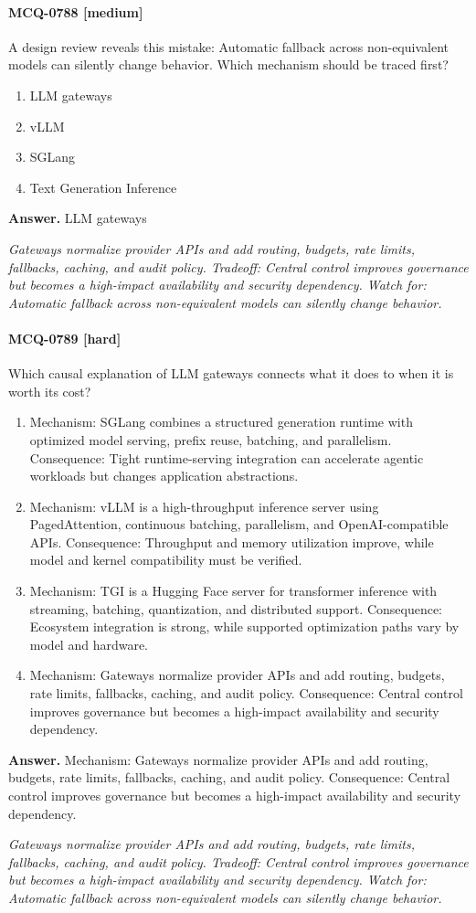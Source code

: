 \paragraph{MCQ-0788 [medium]} A design review reveals this mistake: Automatic fallback across non-equivalent models can silently change behavior. Which mechanism should be traced first?
\begin{enumerate}[label=\Alph*.]
\item LLM gateways
\item vLLM
\item SGLang
\item Text Generation Inference
\end{enumerate}
\noindent\textbf{Answer.} LLM gateways
\par\textit{Gateways normalize provider APIs and add routing, budgets, rate limits, fallbacks, caching, and audit policy. Tradeoff: Central control improves governance but becomes a high-impact availability and security dependency. Watch for: Automatic fallback across non-equivalent models can silently change behavior.}
\paragraph{MCQ-0789 [hard]} Which causal explanation of LLM gateways connects what it does to when it is worth its cost?
\begin{enumerate}[label=\Alph*.]
\item Mechanism: SGLang combines a structured generation runtime with optimized model serving, prefix reuse, batching, and parallelism. Consequence: Tight runtime-serving integration can accelerate agentic workloads but changes application abstractions.
\item Mechanism: vLLM is a high-throughput inference server using PagedAttention, continuous batching, parallelism, and OpenAI-compatible APIs. Consequence: Throughput and memory utilization improve, while model and kernel compatibility must be verified.
\item Mechanism: TGI is a Hugging Face server for transformer inference with streaming, batching, quantization, and distributed support. Consequence: Ecosystem integration is strong, while supported optimization paths vary by model and hardware.
\item Mechanism: Gateways normalize provider APIs and add routing, budgets, rate limits, fallbacks, caching, and audit policy. Consequence: Central control improves governance but becomes a high-impact availability and security dependency.
\end{enumerate}
\noindent\textbf{Answer.} Mechanism: Gateways normalize provider APIs and add routing, budgets, rate limits, fallbacks, caching, and audit policy. Consequence: Central control improves governance but becomes a high-impact availability and security dependency.
\par\textit{Gateways normalize provider APIs and add routing, budgets, rate limits, fallbacks, caching, and audit policy. Tradeoff: Central control improves governance but becomes a high-impact availability and security dependency. Watch for: Automatic fallback across non-equivalent models can silently change behavior.}
